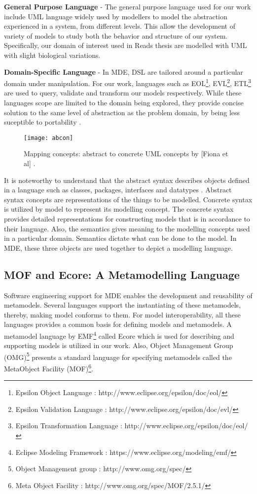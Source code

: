 \documentclass[12pt, a4paper]{report}
\begin{document}
\textbf{General Purpose Language} - The general purpose language used for our work include UML language widely used by modellers to model the abstraction experienced in a system, from different levels. This allow the development of variety of models to study both the behavior and structure of our system. Specifically, our domain of interest used in Reads thesis \cite{Read2011} are modelled with UML with slight biological variations.

\textbf{Domain-Specific Language} - In MDE, DSL are tailored around a particular domain under manipulation. For our work, languages such as EOL\footnote{Epsilon Object Language : http://www.eclipse.org/epsilon/doc/eol/}, EVL\footnote{Epsilon Validation Language : http://www.eclipse.org/epsilon/doc/evl/}, ETL\footnote{Epsilon Transformation Language : http://www.eclipse.org/epsilon/doc/eol/} are used to query, validate and transform our models respectively. While these languages scope are limited to the domain being explored, they provide concise solution to the same level of abstraction as the problem domain, by being less suceptible to portability \cite{Skelly2008}.

\begin{figure}[!ht]
  \centering
  \texttt{[image: abcon]}
  \caption{Mapping concepts: abstract to concrete UML concepts by [Fiona et al] .}
  \label{fig:mrad}
\end{figure}

It is noteworthy to understand that the abstract syntax describes objects defined in a language such as classes, packages, interfaces and datatypes \cite{Rose2011}. Abstract syntax concepts are representations of the things to be modelled. Concrete syntax is utilized by model to represent its modelling concept. The concrete syntax provides detailed representations for constructing models that is in accordance to their language. Also, the semantics gives meaning to the modelling concepts used in a particular domain. Semantics dictate what can be done to the model. In MDE, these three objects are used together to depict a modelling language\cite{Alvarez2001}.

\subsection{MOF and Ecore: A Metamodelling Language} 
Software engineering support for MDE enables the development and reusability of metamodels. Several languages support the instantiating of these metamodels, thereby, making model conforms to them. For model interoperability, all these languages provides a common basis for defining models and metamodels. A metamodel language by EMF\footnote{Eclipse Modeling Framework : https://www.eclipse.org/modeling/emf/} called Ecore which is used for describing and supporting models is utilized in our work. Also, Object Management Group (OMG)\footnote{Object Management group : http://www.omg.org/spec/} presents a standard language for specifying metamodels called the MetaObject Facility (MOF)\footnote{Meta Object Facility : http://www.omg.org/spec/MOF/2.5.1/}.
\end{document}
